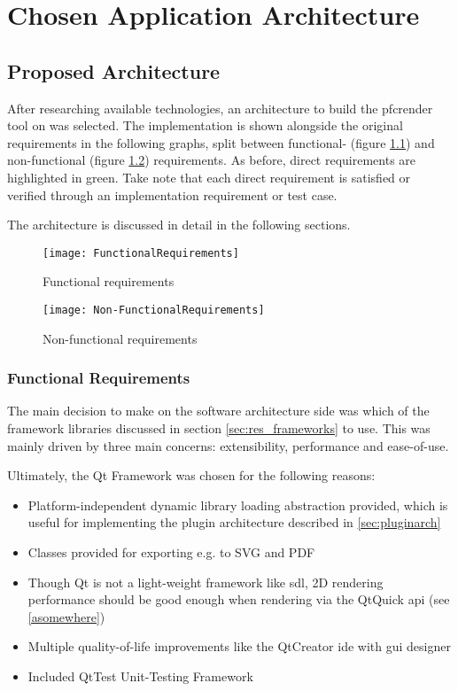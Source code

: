 \chapter{Chosen Application Architecture}

\section{Proposed Architecture}
After researching available technologies, an architecture to build the pfcrender tool on was selected. The implementation is shown alongside the original requirements in the following graphs, split between functional- (figure \ref{fr}) and non-functional (figure \ref{nfr}) requirements. As before, direct requirements are highlighted in green. Take note that each direct requirement is satisfied or verified through an implementation requirement or test case.

The architecture is discussed in detail in the following sections.

\begin{figure}[p]
	\texttt{[image: FunctionalRequirements]}
	\caption{Functional requirements}
	\label{fr}
\end{figure}

\begin{figure}[p]
	\texttt{[image: Non-FunctionalRequirements]}
	\caption{Non-functional requirements}
	\label{nfr}
\end{figure}

\subsection{Functional Requirements}
The main decision to make on the software architecture side was which of the framework libraries discussed in section \ref{sec:res_frameworks} to use.
This was mainly driven by three main concerns: extensibility, performance and ease-of-use.

Ultimately, the Qt Framework was chosen for the following reasons:
\begin{itemize}
	\item Platform-independent dynamic library loading abstraction provided, which is useful for implementing the plugin architecture described in \ref{sec:pluginarch}
	\item Classes provided for exporting e.g. to SVG and PDF
	\item Though Qt is not a light-weight framework like \gls{sdl}, 2D rendering performance should be good enough when rendering via the QtQuick \gls{api} (see \ref{asomewhere})
	\item Multiple quality-of-life improvements like the QtCreator \gls{ide} with \gls{gui} designer
	\item Included QtTest Unit-Testing Framework
\end{itemize}

